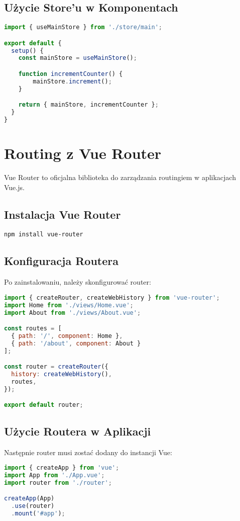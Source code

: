 \documentclass[a4paper,12pt]{article}
\begin{document}
\subsection{Użycie Store'u w Komponentach}
\begin{lstlisting}[language=JavaScript]
import { useMainStore } from './store/main';

export default {
  setup() {
    const mainStore = useMainStore();

    function incrementCounter() {
        mainStore.increment();
    }

    return { mainStore, incrementCounter };
  }
}
\end{lstlisting}

\section{Routing z Vue Router}
Vue Router to oficjalna biblioteka do zarządzania routingiem w aplikacjach Vue.js.

\subsection{Instalacja Vue Router}
\begin{verbatim}
npm install vue-router
\end{verbatim}

\subsection{Konfiguracja Routera}
Po zainstalowaniu, należy skonfigurować router:
\begin{lstlisting}[language=JavaScript]
import { createRouter, createWebHistory } from 'vue-router';
import Home from './views/Home.vue';
import About from './views/About.vue';

const routes = [
  { path: '/', component: Home },
  { path: '/about', component: About }
];

const router = createRouter({
  history: createWebHistory(),
  routes,
});

export default router;
\end{lstlisting}

\subsection{Użycie Routera w Aplikacji}
Następnie router musi zostać dodany do instancji Vue:
\begin{lstlisting}[language=JavaScript]
import { createApp } from 'vue';
import App from './App.vue';
import router from './router';

createApp(App)
  .use(router)
  .mount('#app');
\end{lstlisting}
\end{document}
